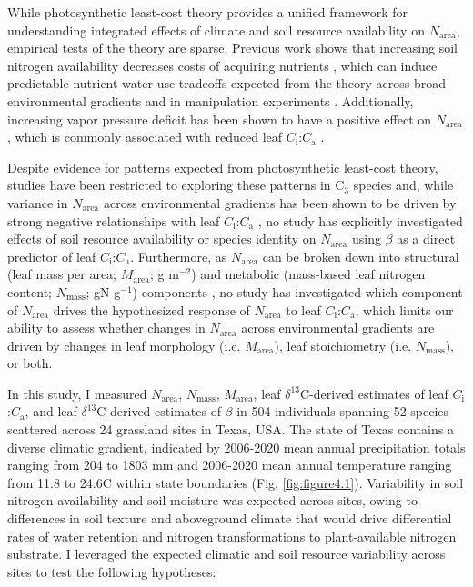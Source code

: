 While photosynthetic least-cost theory provides a unified framework for understanding integrated effects of climate and soil resource availability on $N_\mathrm{area}$, empirical tests of the theory are sparse. Previous work shows that increasing soil nitrogen availability decreases costs of acquiring nutrients , which can induce predictable nutrient-water use tradeoffs expected from the theory across broad environmental gradients  and in manipulation experiments . Additionally, increasing vapor pressure deficit has been shown to have a positive effect on $N_\mathrm{area}$, which is commonly associated with reduced leaf $C_\mathrm{i}$:$C_\mathrm{a}$ .

Despite evidence for patterns expected from photosynthetic least-cost theory, studies have been restricted to exploring these patterns in C$_3$ species and, while variance in $N_\mathrm{area}$ across environmental gradients has been shown to be driven by strong negative relationships with leaf $C_\mathrm{i}$:$C_\mathrm{a}$ , no study has explicitly investigated effects of soil resource availability or species identity on $N_\mathrm{area}$ using $\beta$ as a direct predictor of leaf $C_\mathrm{i}$:$C_\mathrm{a}$. Furthermore, as $N_\mathrm{area}$ can be broken down into structural (leaf mass per area; $M_\mathrm{area}$; g m$^{-2}$) and metabolic (mass-based leaf nitrogen content; $N_\mathrm{mass}$; gN g$^{-1}$) components , no study has investigated which component of $N_\mathrm{area}$ drives the hypothesized response of $N_\mathrm{area}$ to leaf $C_\mathrm{i}$:$C_\mathrm{a}$, which limits our ability to assess whether changes in $N_\mathrm{area}$ across environmental gradients are driven by changes in leaf morphology (i.e. $M_\mathrm{area}$), leaf stoichiometry (i.e. $N_\mathrm{mass}$), or both. 

In this study, I measured $N_\mathrm{area}$, $N_\mathrm{mass}$, $M_\mathrm{area}$, leaf $\delta^{13}$C-derived estimates of leaf $C_\mathrm{i}$:$C_\mathrm{a}$, and leaf $\delta^{13}$C-derived estimates of $\beta$ in 504 individuals spanning 52 species scattered across 24 grassland sites in Texas, USA. The state of Texas contains a diverse climatic gradient, indicated by 2006-2020 mean annual precipitation totals ranging from 204 to 1803 mm and 2006-2020 mean annual temperature ranging from 11.8\textdegree{} to 24.6\textdegree{}C within state boundaries (Fig. \ref{fig:figure4.1}). Variability in soil nitrogen availability and soil moisture was expected across sites, owing to differences in soil texture and aboveground climate that would drive differential rates of water retention and nitrogen transformations to plant-available nitrogen substrate. I leveraged the expected climatic and soil resource variability across sites to test the following hypotheses:

